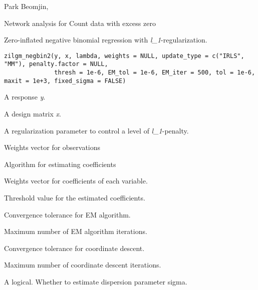 \documentclass[a4paper]{book}
\begin{document}
%
\begin{Author}\relax
Park Beomjin, 
\end{Author}
%
\begin{References}\relax
Network analysis for Count data with excess zero
\end{References}
%
\begin{Description}\relax
Zero-inflated negative binomial regression with \emph{l\_1}-regularization.
\end{Description}
%
\begin{Usage}
\begin{verbatim}
zilgm_negbin2(y, x, lambda, weights = NULL, update_type = c("IRLS", "MM"), penalty.factor = NULL,
              thresh = 1e-6, EM_tol = 1e-6, EM_iter = 500, tol = 1e-6, maxit = 1e+3, fixed_sigma = FALSE)
\end{verbatim}
\end{Usage}
%
\begin{Arguments}
\begin{ldescription}
\item[\code{y}] 
A response \emph{y}.

\item[\code{x}] 
A design matrix \emph{x}.

\item[\code{lambda}] 
A regularization parameter to control a level of \emph{l\_1}-penalty.

\item[\code{weights}] 
Weights vector for observations

\item[\code{update\_type}] 
Algorithm for estimating coefficients

\item[\code{penalty.factor}] 
Weights vector for coefficients of each variable.

\item[\code{thresh}] 
Threshold value for the estimated coefficients.

\item[\code{EM\_tol}] 
Convergence tolerance for EM algorithm.

\item[\code{EM\_iter}] 
Maximum number of EM algorithm iterations.

\item[\code{tol}] 
Convergence tolerance for coordinate descent.

\item[\code{maxit}] 
Maximum number of coordinate descent iterations.

\item[\code{fixed\_sigma}] 
A logical. Whether to estimate dispersion parameter sigma.

\end{ldescription}
\end{Arguments}
\end{document}
